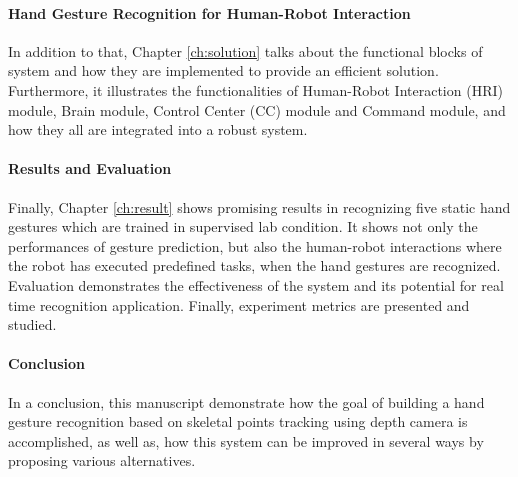 \paragraph*{Hand Gesture Recognition for Human-Robot Interaction} In addition to that, Chapter \ref{ch:solution} talks about the functional blocks of system and how they are implemented to provide an efficient solution. Furthermore, it illustrates the functionalities of Human-Robot Interaction (HRI) module, Brain module, Control Center (CC) module and Command module, and how they all are integrated into a robust system.

\paragraph*{Results and Evaluation} Finally, Chapter \ref{ch:result} shows promising results in recognizing five static hand gestures which are trained in supervised lab condition. It shows not only the performances of gesture prediction, but also the human-robot interactions where the robot has executed predefined tasks, when the hand gestures are recognized. Evaluation demonstrates the effectiveness of the system and its potential for real time recognition application. Finally, experiment metrics are presented and studied.

\paragraph*{Conclusion} In a conclusion, this manuscript demonstrate how the goal of building a hand gesture recognition based on skeletal points tracking using depth camera is accomplished, as well as, how this system can be improved in several ways by proposing various alternatives.
